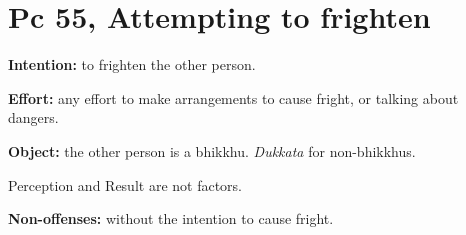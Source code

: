 \section{Pc 55, Attempting to frighten}

\textbf{Intention:} to frighten the other person.

\textbf{Effort:} any effort to make arrangements to cause fright, or
talking about dangers.

\textbf{Object:} the other person is a bhikkhu. \emph{Dukkata} for
non-bhikkhus.

Perception and Result are not factors.

\textbf{Non-offenses:} without the intention to cause fright.

